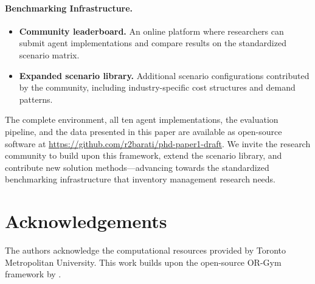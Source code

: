 \paragraph{Benchmarking Infrastructure.}
\begin{itemize}
  \item \textbf{Community leaderboard.} An online platform where
        researchers can submit agent implementations and compare
        results on the standardized scenario matrix.
  \item \textbf{Expanded scenario library.} Additional scenario
        configurations contributed by the community, including
        industry-specific cost structures and demand patterns.
\end{itemize}

The complete environment, all ten agent implementations, the
evaluation pipeline, and the data presented in this paper are
available as open-source software at
\url{https://github.com/r2barati/phd-paper1-draft}. We invite the
research community to build upon this framework, extend the scenario
library, and contribute new solution methods---advancing towards the
standardized benchmarking infrastructure that inventory management
research needs.

\section*{Acknowledgements}

The authors acknowledge the computational resources provided by
Toronto Metropolitan University. This work builds upon the open-source
OR-Gym framework by \citet{hubbs2020orgym}.




